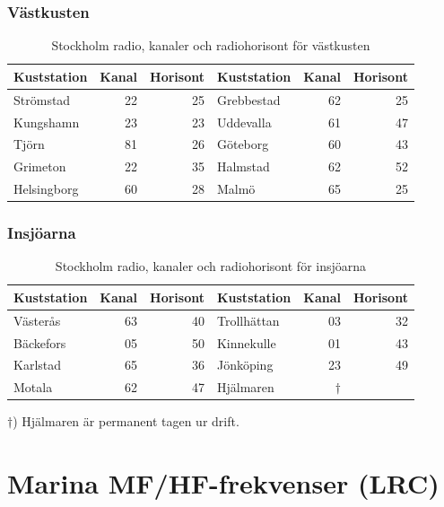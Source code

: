{\subsubsection{Västkusten}

\begin{table}[H]
\centering
\begin{tabular}{lrr|lrr}
\textbf{Kuststation} & \textbf{Kanal} & \textbf{Horisont} &
\textbf{Kuststation} & \textbf{Kanal} & \textbf{Horisont} \\
\hline
Strömstad   & 22 & 25 & Grebbestad & 62 & 25 \\
Kungshamn   & 23 & 23 & Uddevalla  & 61 & 47 \\
Tjörn       & 81 & 26 & Göteborg   & 60 & 43 \\
Grimeton    & 22 & 35 & Halmstad   & 62 & 52 \\
Helsingborg & 60 & 28 & Malmö      & 65 & 25 \\
\end{tabular}
\caption{Stockholm radio, kanaler och radiohorisont för västkusten}
\end{table}

\subsubsection{Insjöarna}

\begin{table}[H]
\centering
\begin{tabular}{lrr|lrr}
\textbf{Kuststation} & \textbf{Kanal} & \textbf{Horisont} &
\textbf{Kuststation} & \textbf{Kanal} & \textbf{Horisont} \\
\hline
Västerås  & 63 & 40 & Trollhättan & 03 & 32 \\
Bäckefors & 05 & 50 & Kinnekulle  & 01 & 43 \\
Karlstad  & 65 & 36 & Jönköping   & 23 & 49 \\
Motala    & 62 & 47 & Hjälmaren     & $\dagger$  &    \\
\end{tabular}
\caption{Stockholm radio, kanaler och radiohorisont för insjöarna}
\end{table}

$\dagger$) Hjälmaren är permanent tagen ur drift.


\section{Marina MF/HF-frekvenser (LRC)}

}
